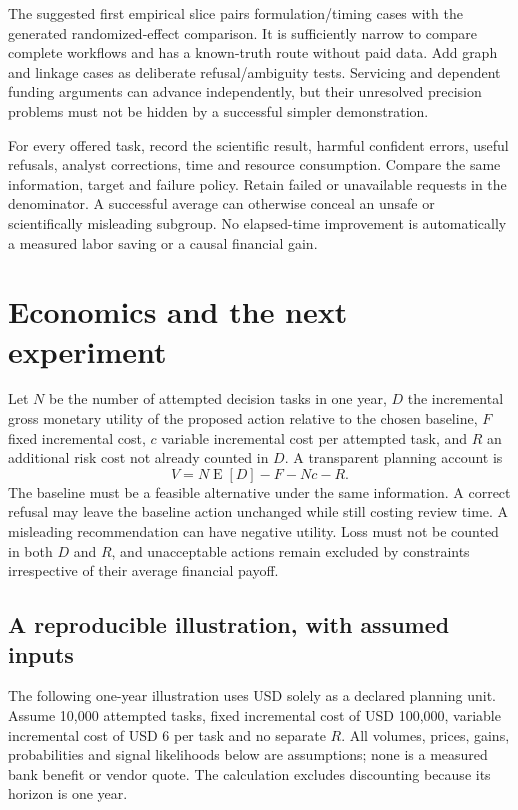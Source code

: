 The suggested first empirical slice pairs formulation/timing cases with
the generated randomized-effect comparison. It is sufficiently narrow to
compare complete workflows and has a known-truth route without paid
data. Add graph and linkage cases as deliberate refusal/ambiguity tests.
Servicing and dependent funding arguments can advance independently, but
their unresolved precision problems must not be hidden by a successful
simpler demonstration.

For every offered task, record the scientific result, harmful confident
errors, useful refusals, analyst corrections, time and resource
consumption. Compare the same information, target and failure policy.
Retain failed or unavailable requests in the denominator. A successful
average can otherwise conceal an unsafe or scientifically misleading
subgroup. No elapsed-time improvement is automatically a measured labor
saving or a causal financial gain. \citep{sp13_economics}

\hypertarget{economics-and-the-next-experiment}{%
\section{Economics and the next
experiment}\label{economics-and-the-next-experiment}}

Let \(N\) be the number of attempted decision tasks in one year, \(D\)
the incremental gross monetary utility of the proposed action relative
to the chosen baseline, \(F\) fixed incremental cost, \(c\) variable
incremental cost per attempted task, and \(R\) an additional risk cost
not already counted in \(D\). A transparent planning account is \[
 V=N\operatorname{E}[D]-F-Nc-R.
\] The baseline must be a feasible alternative under the same
information. A correct refusal may leave the baseline action unchanged
while still costing review time. A misleading recommendation can have
negative utility. Loss must not be counted in both \(D\) and \(R\), and
unacceptable actions remain excluded by constraints irrespective of
their average financial payoff. \citep{sp13_economics}

\hypertarget{a-reproducible-illustration-with-assumed-inputs}{%
\subsection{A reproducible illustration, with assumed
inputs}\label{a-reproducible-illustration-with-assumed-inputs}}

The following one-year illustration uses USD solely as a declared
planning unit. Assume 10,000 attempted tasks, fixed incremental cost of
USD 100,000, variable incremental cost of USD 6 per task and no separate
\(R\). All volumes, prices, gains, probabilities and signal likelihoods
below are assumptions; none is a measured bank benefit or vendor quote.
The calculation excludes discounting because its horizon is one year.
\citep{sp13_economics}

